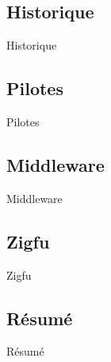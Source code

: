 \subsection{Historique}
\begin{frame}{Historique}
\end{frame}

\subsection{Pilotes}
\begin{frame}{Pilotes}
\end{frame}

\subsection{Middleware}
\begin{frame}{Middleware}
\end{frame}

\subsection{Zigfu}
\begin{frame}{Zigfu}
\end{frame}

\subsection{Résumé}
\begin{frame}{Résumé}
\end{frame}